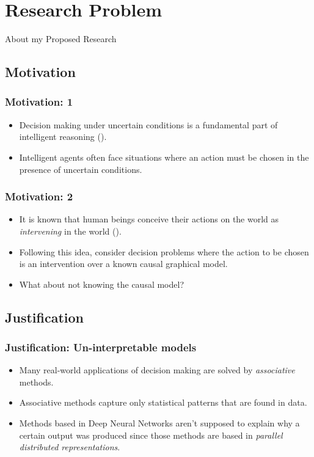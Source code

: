 \documentclass{beamer}
\theoremstyle{plain}
\begin{document}
\section{Research Problem}
\begin{frame}
About my Proposed Research
\end{frame}
	\subsection{Motivation}
	\begin{frame}
	\frametitle{Motivation: 1}
	\begin{itemize}
	\item Decision making under uncertain conditions is a fundamental part of intelligent reasoning (\cite{lake2017building}).
	\item Intelligent agents often face situations where an action must be chosen in the presence of uncertain conditions.
	\end{itemize}
	\end{frame}
	\begin{frame}
	\frametitle{Motivation: 2}
	\begin{itemize}
	\item It is known that human beings conceive their actions on the world as \textit{intervening} in the world (\cite{hagmayer2009decision}).
	\item Following this idea, \cite{lattimoreNIPS2016} consider decision problems where the action to be chosen is an intervention over a known causal graphical model.
	\item What about not knowing the causal model? 
	\end{itemize}
	\end{frame}
	
	\subsection{Justification}
	\begin{frame}
	\frametitle{Justification: Un-interpretable models}
	\begin{itemize}
	\item Many real-world applications of decision making are solved by \textit{associative} methods.
	\item Associative methods capture only statistical patterns that are found in data.
	\item Methods based in Deep Neural Networks aren't supposed to explain why a certain output was produced since those methods are based in \textit{parallel distributed representations}.
	\end{itemize}
	\end{frame}
	
\end{document}
